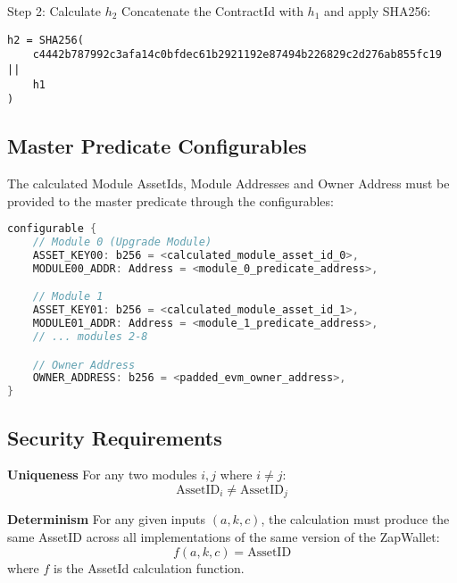 Step 2: Calculate $h_2$
Concatenate the ContractId with $h_1$ and apply SHA256:
\begin{Verbatim}
h2 = SHA256(
    c4442b787992c3afa14c0bfdec61b2921192e87494b226829c2d276ab855fc19 ||
    h1
)
\end{Verbatim}

\subsection{Master Predicate Configurables}
The calculated Module AssetIds, Module Addresses and Owner Address must be provided to the master predicate through the configurables:

\begin{lstlisting}[language=Rust]
configurable {
    // Module 0 (Upgrade Module)
    ASSET_KEY00: b256 = <calculated_module_asset_id_0>,
    MODULE00_ADDR: Address = <module_0_predicate_address>,

    // Module 1
    ASSET_KEY01: b256 = <calculated_module_asset_id_1>,
    MODULE01_ADDR: Address = <module_1_predicate_address>,
    // ... modules 2-8

    // Owner Address
    OWNER_ADDRESS: b256 = <padded_evm_owner_address>,
}
\end{lstlisting}

\subsection{Security Requirements}
\textbf{Uniqueness}
For any two modules $i, j$ where $i \neq j$:
\[ \text{AssetID}_i \neq \text{AssetID}_j \]

\textbf{Determinism}
For any given inputs $(a, k, c)$, the calculation must produce the same AssetID across all implementations of the same version of the ZapWallet:
\[ f(a, k, c) = \text{AssetID} \]
where $f$ is the AssetId calculation function.



